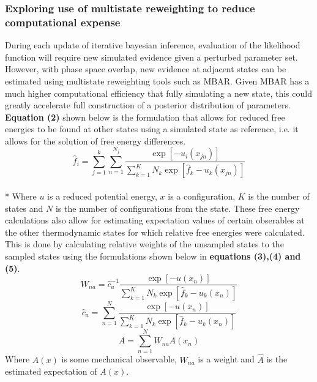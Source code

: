 \documentclass[rmp,nofootinbib,superscriptaddress,12pt,tightenlines,notitlepage]{revtex4-1}
\begin{document}
\subsubsection{Exploring use of multistate reweighting to reduce computational expense}
During each update of iterative bayesian inference, evaluation of the likelihood function will require new simulated evidence given a perturbed parameter set. However, with phase space overlap, new evidence at adjacent states can be estimated using multistate reweighting tools such as MBAR. \cite{mbar} Given MBAR has a much higher computational efficiency that fully simulating a new state, this could greatly accelerate full construction of a posterior distribution of parameters. \textbf{Equation (2)} shown below is the formulation that allows for reduced free energies to be found at other states using a simulated state as reference, i.e. it allows for the solution of free energy differences.
\begin{equation} \hat{f}_i = \sum_{j=1}^{k}\sum_{n=1}^{N_j} \frac{\exp\left[-u_{i}\left(x_{jn}\right)\right]}{\sum_{k=1}^{K} N_k \exp\left[\hat{f}_k - u_{k}\left(x_{jn}\right)\right]}\end{equation}\\*
Where $u$ is a reduced potential energy, $x$ is a configuration, $K$ is the number of states and $N$ is the number of configurations from the state. These free energy calculations also allow for estimating expectation values of certain obserables at the other thermodynamic states for which relative free energies were calculated. This is done by calculating relative weights of the unsampled states to the sampled states using the formulations shown below in \textbf{equations (3),(4) and (5)}.
\begin{equation} W_{na} = \hat{c}_{a}^{-1} \frac{\exp\left[-u\left(x_{n}\right)\right]}{\sum_{k=1}^{K} N_k \exp\left[\hat{f}_k - u_{k}\left(x_{n}\right)\right]}\end{equation}
\begin{equation} \hat{c}_a = \sum_{n=1}^{N} \frac{\exp\left[-u\left(x_{n}\right)\right]}{\sum_{k=1}^{K} N_k \exp\left[\hat{f}_k - u_{k}\left(x_{n}\right)\right]}\end{equation}
\begin{equation} \hat{A} = \sum_{n=1}^{N} W_{na} A\left(x_n\right)\end{equation}
Where $A(x)$ is some mechanical observable, $W_{na}$ is a weight and $\hat{A}$ is the estimated expectation of $A(x)$. 
\end{document}
